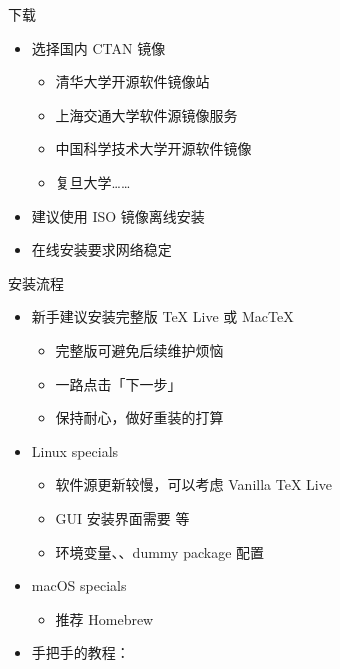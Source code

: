\begin{frame}{下载}
\begin{itemize}
  \item 选择国内 CTAN 镜像

    \begin{itemize}
      \item 清华大学开源软件镜像站 
      \item 上海交通大学软件源镜像服务 
      \item 中国科学技术大学开源软件镜像  \pause
      \item 复旦大学……
    \end{itemize} \pause

  \item 建议使用 ISO 镜像离线安装
  \item 在线安装要求网络稳定
\end{itemize}
\end{frame}

\begin{frame}{安装流程}
\begin{itemize}
  \item 新手建议安装完整版 \TeX{} Live 或 Mac\TeX{}

    \begin{itemize}
      \item 完整版可避免后续维护烦恼
      \item 一路点击「下一步」
      \item 保持耐心，做好重装的打算
    \end{itemize} \pause

  \item Linux specials

    \begin{itemize}
      \item 软件源更新较慢，可以考虑 Vanilla \TeX{} Live
      \item GUI 安装界面需要  等
      \item 环境变量、、dummy package 配置
    \end{itemize}

  \item macOS specials

    \begin{itemize}
      \item 推荐 Homebrew \href{https://brew.sh}{\faBeer}
    \end{itemize}

  \item 手把手的教程：
\end{itemize}
\end{frame}


